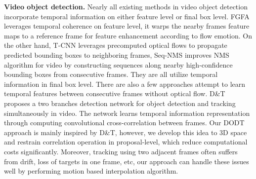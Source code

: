\documentclass[letterpaper, 10 pt, conference]{ieeeconf}  %
\begin{document}
\textbf{Video object detection.} Nearly all existing methods in video object detection incorporate temporal information on either feature level or final box level. FGFA \cite{zhu2017flow} leverages temporal coherence on feature level, it warps the nearby frames feature maps to a reference frame for feature enhancement according to flow emotion. On the other hand, T-CNN \cite{kang2018t, kang2016object} leverages precomputed optical flows to propagate predicted bounding boxes to neighboring frames, Seq-NMS \cite{han2016seq} improves NMS algorithm for video by constructing sequences along nearby high-confidence bounding boxes from consecutive frames. They are all utilize temporal information in final box level. There are also a few approaches attempt to learn temporal features between consecutive frames without optical flow. D\&T \cite{feichtenhofer2017detect} proposes a two branches detection network for object detection and tracking simultaneously in video. The network learns temporal information representation through computing convolutional cross-correlation between frames. Our DODT approach is mainly inspired by D\&T, however, we develop this idea to 3D space and restrain correlation operation in proposal-level, which reduce computational costs significantly. Moreover, tracking using two adjacent frames often suffers from drift, loss of targets in one frame, etc, our approach can handle these issues well by performing motion based interpolation algorithm.


\end{document}
